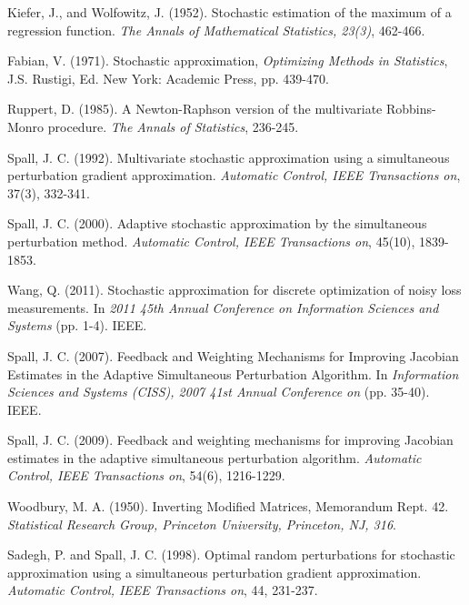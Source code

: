 \documentclass[conference]{IEEEtran}
\newcommand{\remove}[1]{}
\begin{document}
\begin{thebibliography}{1}
	
	Kiefer, J., and Wolfowitz, J. (1952). Stochastic estimation of the maximum of a regression function.\textit{ The Annals of Mathematical Statistics, 23(3)}, 462-466.
	
	Fabian, V. (1971). Stochastic approximation, \textit{Optimizing Methods in Statistics}, J.S. Rustigi, Ed. New York: Academic Press, pp. 439-470.
	
	Ruppert, D. (1985). A Newton-Raphson version of the multivariate Robbins-Monro procedure. \textit{The Annals of Statistics}, 236-245.

 Spall, J. C. (1992). Multivariate
  stochastic approximation using a simultaneous perturbation gradient
  approximation. \textit{Automatic Control, IEEE Transactions on},
  37(3), 332-341.

 Spall, J. C. (2000). Adaptive
  stochastic approximation by the simultaneous perturbation
  method. \textit{Automatic Control, IEEE Transactions on}, 45(10),
  1839-1853.


Wang, Q. (2011). Stochastic approximation for discrete optimization of noisy loss measurements. In \textit{2011 45th Annual Conference on Information Sciences and Systems} (pp. 1-4).  IEEE.



Spall, J. C. (2007). Feedback and Weighting Mechanisms for Improving Jacobian Estimates in the Adaptive Simultaneous Perturbation Algorithm. In \textit{Information Sciences and Systems (CISS), 2007 41st Annual Conference on} (pp. 35-40). IEEE.


 Spall, J. C. (2009). Feedback and
  weighting mechanisms for improving Jacobian estimates in the adaptive
  simultaneous perturbation algorithm. \textit{Automatic Control, IEEE
    Transactions on}, 54(6), 1216-1229.


 Woodbury,
  M. A. (1950). Inverting Modified Matrices, Memorandum
  Rept. 42. \textit{Statistical Research Group, Princeton University,
    Princeton, NJ, 316}.

\remove
{
	\bibitem{Bar-Itzhack1998} Bar-Itzhack,
	I.Y. (1998). Matrix symmetrization. \textit{Journal of guidance,
		control, and dynamics}, 21(1), 178-179.
	}


 Sadegh, P. and Spall,
  J. C. (1998). Optimal random perturbations for stochastic
  approximation using a simultaneous perturbation gradient
  approximation. \textit{Automatic Control, IEEE Transactions on}, 44,
  231-237.


\end{thebibliography}
\end{document}
